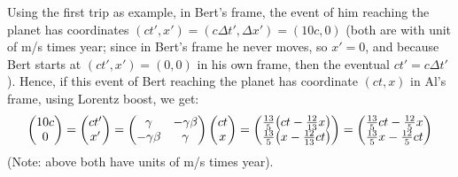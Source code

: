 \documentclass{article}
\DeclarePairedDelimiter{\paran}{(}{)}%
\begin{document}

Using the first trip as example, in Bert's frame, the event of him reaching the planet has coordinates $(ct', x') = (c\Delta t', \Delta x') = (10c, 0)$ (both are with unit of m/s times year; since in Bert's frame he never moves, so $x'=0$, and because Bert starts at $(ct',x')=(0,0)$ in his own frame, then the eventual $ct'= c\Delta t'$). Hence, if this event of Bert reaching the planet has coordinate $(ct, x)$ in Al's frame, using Lorentz boost, we get:
\begin{align}
    \begin{pmatrix}
        10c\\
        0
    \end{pmatrix} = \begin{pmatrix}
        ct'\\x'
    \end{pmatrix} = \begin{pmatrix}
        \gamma & -\gamma\beta\\
        -\gamma\beta & \gamma
    \end{pmatrix}\begin{pmatrix}
        ct\\x
    \end{pmatrix} = \begin{pmatrix}
        \frac{13}{5}\paran*{ct - \frac{12}{13}x}\\
        \frac{13}{5}\paran*{x - \frac{12}{13}ct}
    \end{pmatrix} = \begin{pmatrix}
        \frac{13}{5}ct - \frac{12}{5}x\\
        \frac{13}{5}x - \frac{12}{5}ct
    \end{pmatrix}
\end{align}
(Note: above both have units of m/s times year).
\end{document}
